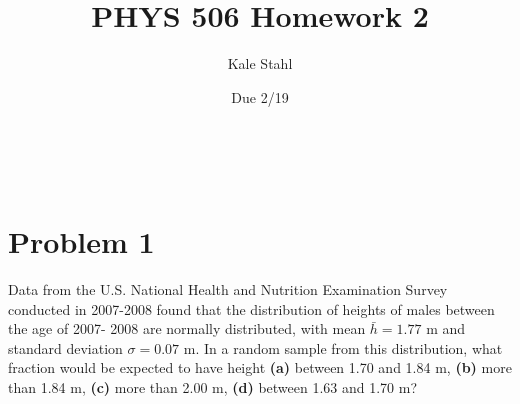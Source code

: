 \documentclass[]{article}
\title{PHYS 506 Homework 2}
\date{Due 2/19}
\author{Kale Stahl}
\newcommand{\bd}{\textbf}
\begin{document}
	
	\makeatletter
	\begin{center}
		{\centering \Large \bd \@title}\\
		\vspace{.5cm}
		{\large \@author}
		\vspace{.25cm}
	\end{center}
	\makeatother
	
	\section*{Problem 1} %
		Data from the U.S. National Health and Nutrition Examination Survey conducted in
		2007-2008 found that the distribution of heights of males between the age of 2007-		2008 are normally distributed, with mean $\bar h = 1.77$ m and standard deviation $\sigma = 0.07$ m. In a random sample from this distribution, what fraction would be expected to have height	\bd{(a)} between 1.70 and 1.84 m, \bd{(b)} more than 1.84 m, \bd{(c)} more than 2.00 m, \bd{(d)} between 1.63 and 1.70 m?
\end{document}
